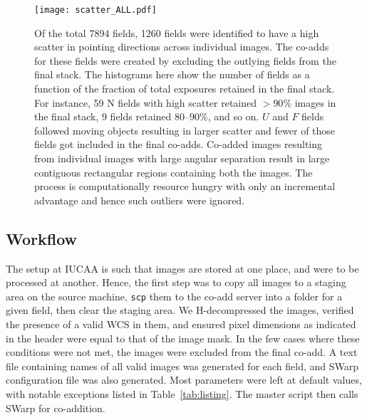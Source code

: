 \documentclass[fleqn,usenatbib]{mnras}
\begin{document}
\begin{figure}
\centering
\texttt{[image: scatter\_ALL.pdf]}
\caption{\label{fig:scaa}
Of the total 7894 fields, 1260 fields were identified to have a high scatter in pointing directions across individual images. The co-adds for these fields were created by excluding the outlying fields from the final stack. The histograms here show the number of fields as a function of the fraction of total exposures retained in the final stack. For instance, 59 N fields with high scatter retained $>90\%$ images in the final stack, 9 fields retained 80--90\%, and so on. $U$ and $F$ fields followed moving objects resulting in larger scatter and fewer of those fields got included in the final co-adds. Co-added images resulting from individual images with large angular separation result in large contiguous rectangular regions containing both the images. The process is computationally resource hungry with only an incremental advantage and hence such outliers were ignored.  }
\end{figure}


\subsection{Workflow}\label{subsec:workflow}
The setup at IUCAA is such that images are stored at one place, and were to be processed at another. Hence, the first step was to copy all images to a staging area on the source machine, \texttt{scp} them to the co-add server into a folder for a given field, then clear the staging area. We H-decompressed the images,
verified the presence of a valid WCS in them, and ensured pixel dimensions as indicated in the header were equal to that of the image mask.  In the few cases where these conditions were not met, the images were excluded from the final co-add. A text file containing names of all valid images was generated for each field, and SWarp configuration file was also generated. Most parameters were left at default values, with notable exceptions listed in Table~\ref{tab:listing}.
The master script then calls SWarp for co-addition.
\end{document}
